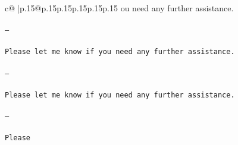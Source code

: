 \documentclass{article}
\begin{document}
{\begin{supertabular}{c@{$\;$}|p{.15\linewidth}@{}p{.15\linewidth}p{.15\linewidth}p{.15\linewidth}p{.15\linewidth}p{.15\linewidth}}
{{{ou need any further assistance. \\ \tt \\ \tt ---\\ \tt \\ \tt Please let me know if you need any further assistance. \\ \tt \\ \tt ---\\ \tt \\ \tt Please let me know if you need any further assistance. \\ \tt \\ \tt ---\\ \tt \\ \tt Please}}}
\end{supertabular}}
\end{document}
